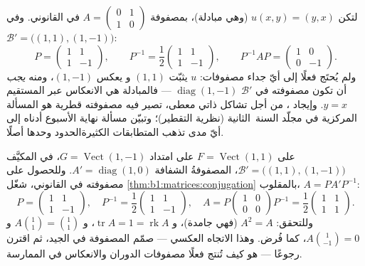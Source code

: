 \begin{example}
\label{ex:b1:matrices:conjugationrun}
لتكن $u(x, y) = (y, x)$ (وهي مبادلة)، بمصفوفة $A = \begin{pmatrix} 0
& 1\\ 1 & 0\end{pmatrix}$ في  القانوني. وفي 
$\mathcal B' = \bigl((1,1), (1,-1)\bigr)$:
\[
P = \begin{pmatrix} 1 & 1\\ 1 & -1 \end{pmatrix},
\qquad
P^{-1} = \frac12\begin{pmatrix} 1 & 1\\ 1 & -1 \end{pmatrix},
\qquad
P^{-1} A P = \begin{pmatrix} 1 & 0\\ 0 & -1 \end{pmatrix}.
\]
ولم يُحتَج فعلًا إلى أيّ جداء مصفوفات:  $u$ يثبّت $(1,1)$ و
يعكس $(1,-1)$، ومنه \emph{يجب} أن تكون مصفوفته في $\mathcal B'$
$\operatorname{diag}(1, -1)$ --- فالمبادلة هي الانعكاس
عبر المستقيم $y = x$. وإيجاد ، من أجل تشاكل ذاتي معطى،
تصير فيه مصفوفته قطرية هو المسألة المركزية
في مجلّد السنة~الثانية (نظرية التقطير)؛ وتبيّن مسألة نهاية الأسبوع
أدناه إلى أيّ مدى تذهب المتطابقات الكثيرةالحدود وحدها أصلًا.
\end{example}

\begin{example}
\label{ex:b1:matrices:reverserun}
 على $F = \operatorname{Vect}(1,1)$ على امتداد $G =
\operatorname{Vect}(1,-1)$، في  المكيَّف $\mathcal
B' = \bigl((1,1),(1,-1)\bigr)$، المصفوفةُ الشفافة $A' =
\operatorname{diag}(1, 0)$. وللحصول على مصفوفته في  القانوني،
شغّل \cref{thm:b1:matrices:conjugation} بالمقلوب، $A = P A'
P^{-1}$:
\[
P = \begin{pmatrix} 1 & 1\\ 1 & -1\end{pmatrix},
\quad
P^{-1} = \frac12\begin{pmatrix} 1 & 1\\ 1 & -1\end{pmatrix},
\quad
A = P\begin{pmatrix} 1 & 0\\ 0 & 0\end{pmatrix}P^{-1}
= \frac12\begin{pmatrix} 1 & 1\\ 1 & 1\end{pmatrix}.
\]
وللتحقق: $A^2 = A$ (فهي جامدة)، و $\operatorname{tr} A = 1 =
\operatorname{rk} A$، و $A\binom{1}{1} = \binom11$ و
$A\binom{1}{-1} = 0$، كما فُرض. وهذا الاتجاه العكسي ---
صمّم المصفوفة في  الجيد، ثم اقترن رجوعًا --- هو
كيف تُنتج فعلًا مصفوفات الدوران والانعكاس  في الممارسة.
\end{example}

